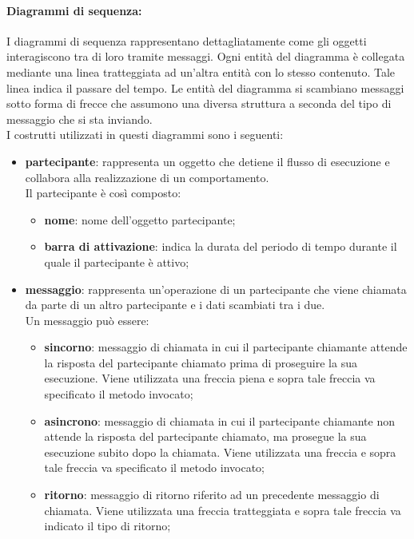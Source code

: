 \paragraph{Diagrammi di sequenza:}\label{ProcessiPrimariProgettazioneUMLDiagrammiDiSequenza}
I diagrammi di sequenza rappresentano dettagliatamente come gli oggetti interagiscono tra di loro tramite messaggi. Ogni entità del diagramma è collegata mediante una linea tratteggiata ad un'altra entità con lo stesso contenuto. Tale linea indica il passare del tempo. Le entità del diagramma si scambiano messaggi sotto forma di frecce che assumono una diversa struttura a seconda del tipo di messaggio che si sta inviando. \\
I costrutti utilizzati in questi diagrammi sono i seguenti:

\begin{itemize}
	\item \textbf{partecipante}: rappresenta un oggetto che detiene il flusso di esecuzione e collabora alla realizzazione di un comportamento. \\
	Il partecipante è così composto:
\begin{itemize}
	\item \textbf{nome}: nome dell'oggetto partecipante;
	\item \textbf{barra di attivazione}: indica la durata del periodo di tempo durante il quale il partecipante è attivo;
\end{itemize}
	\item \textbf{messaggio}: rappresenta un'operazione di un partecipante che viene chiamata da parte di un altro partecipante e i dati scambiati tra i due.\\
	Un messaggio può essere:
\begin{itemize}
	\item \textbf{sincorno}: messaggio di chiamata in cui il partecipante chiamante attende la risposta del partecipante chiamato prima di proseguire la sua esecuzione. Viene utilizzata una freccia piena e sopra tale freccia va specificato il metodo invocato;
	\item \textbf{asincrono}: messaggio di chiamata in cui il partecipante chiamante non attende la risposta del partecipante chiamato, ma prosegue la sua esecuzione subito dopo la chiamata. Viene utilizzata una freccia e sopra tale freccia va specificato il metodo invocato;
	\item \textbf{ritorno}: messaggio di ritorno riferito ad un precedente messaggio di chiamata. Viene utilizzata una freccia tratteggiata e sopra tale freccia va indicato il tipo di ritorno;

\end{itemize}
\end{itemize}
